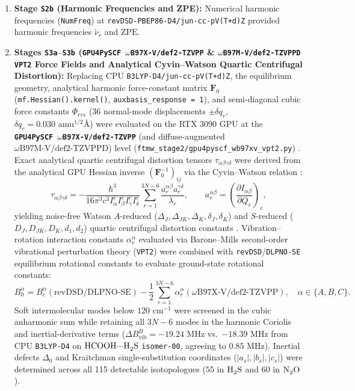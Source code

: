 \documentclass[journal=jpclcd,manuscript=article]{achemso}
\begin{document}
\begin{enumerate}
  \item \textbf{Stage \texttt{S2b} (Harmonic Frequencies and ZPE):} Numerical harmonic frequencies (\texttt{NumFreq}) at \texttt{revDSD-PBEP86-D4/jun-cc-pV(T+d)Z} provided harmonic frequencies $\tilde{\nu}_r$ and $\mathrm{ZPE}$.
  \item \textbf{Stages \texttt{S3a}--\texttt{S3b} (\texttt{GPU4PySCF $\omega$B97X-V/def2-TZVPP} \& \texttt{$\omega$B97M-V/def2-TZVPPD} \texttt{VPT2} Force Fields and Analytical Cyvin--Watson Quartic Centrifugal Distortion):} Replacing CPU \texttt{B3LYP-D4/jun-cc-pV(T+d)Z}, the equilibrium geometry, analytical harmonic force-constant matrix $\mathbf{F}_0$ (\texttt{mf.Hessian().kernel()}, \texttt{auxbasis\_response = 1}), and semi-diagonal cubic force constants $\Phi_{rrs}$ ($36$ normal-mode displacements $\pm\delta q_r$, $\delta q_r = 0.030\text{ amu}^{1/2}\text{\AA}$) were evaluated on the RTX 3090 GPU at the \textbf{\texttt{GPU4PySCF $\omega$B97X-V/def2-TZVPP}} (and diffuse-augmented \textbf{$\omega\text{B97M-V/def2-TZVPPD}$}) level (\texttt{ftmw\_stage2/gpu4pyscf\_wb97xv\_vpt2.py}) \cite{Mardirossian2014, Mardirossian2016, Vydrov2010, Rappoport2010, Wu2024, Li2024}. Exact analytical quartic centrifugal distortion tensors $\tau_{\alpha\beta\gamma\delta}$ were derived from the analytical GPU Hessian inverse $(\mathbf{F}_0^{-1})_{ij}$ via the Cyvin--Watson relation \cite{Cyvin1968, Watson1977}:
  \begin{equation}
    \tau_{\alpha\beta\gamma\delta} = -\frac{\hbar^3}{16\pi^3 c^3 I_\alpha^e I_\beta^e I_\gamma^e I_\delta^e}\sum_{r=1}^{3N-6}\frac{a_r^{\alpha\beta} a_r^{\gamma\delta}}{\lambda_r}, \qquad a_r^{\alpha\beta} = \left(\frac{\partial I_{\alpha\beta}}{\partial Q_r}\right)_e,
  \end{equation}
  yielding noise-free Watson $A$-reduced ($\Delta_J, \Delta_{JK}, \Delta_K, \delta_J, \delta_K$) and $S$-reduced ($D_J, D_{JK}, D_K, d_1, d_2$) quartic centrifugal distortion constants \cite{Watson1977}. Vibration--rotation interaction constants $\alpha_r^\alpha$ evaluated via Barone--Mills second-order vibrational perturbation theory (\texttt{VPT2}) \cite{Barone2005, Mills1972} were combined with \texttt{revDSD}/\texttt{DLPNO-SE} equilibrium rotational constants to evaluate ground-state rotational constants:
  \begin{equation}
    B_0^\alpha = B_e^\alpha(\text{revDSD/DLPNO-SE}) - \frac{1}{2}\sum_{r=1}^{3N-6} \alpha_r^\alpha(\omega\text{B97X-V/def2-TZVPP}), \quad \alpha \in \{A, B, C\}.
  \end{equation}
  Soft intermolecular modes below $120\text{ cm}^{-1}$ were screened in the cubic anharmonic sum while retaining all $3N-6$ modes in the harmonic Coriolis and inertial-derivative terms ($\Delta B_{\mathrm{vib}}^B = -19.24\text{ MHz}$ vs.\ $-18.39\text{ MHz}$ from CPU \texttt{B3LYP-D4} on $\ce{HCOOH\bond{...}H2S}$ \texttt{isomer-00}, agreeing to $0.85\text{ MHz}$). Inertial defects $\Delta_0$ and Kraitchman single-substitution coordinates ($|a_s|, |b_s|, |c_s|$) \cite{Kraitchman1953} were determined across all 115 detectable isotopologues ($55$ in $\ce{H2S}$ and $60$ in $\ce{N2O}$).

\end{enumerate}
\end{document}
